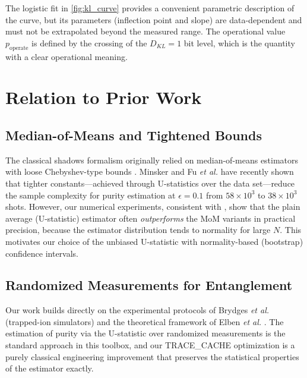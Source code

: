 \documentclass[12pt,a4paper,oneside]{book}
\theoremstyle{plain}
\theoremstyle{definition}
\theoremstyle{remark}
\begin{document}
The logistic fit in \cref{fig:kl_curve} provides a convenient parametric description of the curve, but its parameters (inflection point and slope) are data-dependent and must not be extrapolated beyond the measured range. The operational value $p_{\text{operate}}$ is defined by the crossing of the $D_{KL} = 1$ bit level, which is the quantity with a clear operational meaning.

\section{Relation to Prior Work}
\label{sec:disc_related}

\subsection{Median-of-Means and Tightened Bounds}

The classical shadows formalism originally relied on median-of-means estimators with loose Chebyshev-type bounds \cite{huang2020predicting}. Minsker \cite{minsker2023efficient} and Fu \textit{et al.} \cite{fu2025classical} have recently shown that tighter constants---achieved through U-statistics over the data set---reduce the sample complexity for purity estimation at $\epsilon = 0.1$ from $58 \times 10^3$ to $38 \times 10^3$ shots. However, our numerical experiments, consistent with \cite{fu2025classical}, show that the plain average (U-statistic) estimator often \emph{outperforms} the MoM variants in practical precision, because the estimator distribution tends to normality for large $N$. This motivates our choice of the unbiased U-statistic with normality-based (bootstrap) confidence intervals.

\subsection{Randomized Measurements for Entanglement}

Our work builds directly on the experimental protocols of Brydges \textit{et al.} \cite{brydges2019probing} (trapped-ion simulators) and the theoretical framework of Elben \textit{et al.} \cite{elben2020cross, elben2023toolbox}. The estimation of purity via the U-statistic over randomized measurements is the standard approach in this toolbox, and our TRACE\_CACHE optimization is a purely classical engineering improvement that preserves the statistical properties of the estimator exactly.
\end{document}
